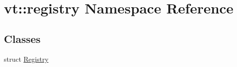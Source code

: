 \hypertarget{namespacevt_1_1registry}{}\section{vt\+:\+:registry Namespace Reference}
\label{namespacevt_1_1registry}
\subsection*{Classes}
\begin{DoxyCompactItemize}
\item 
struct \hyperlink{structvt_1_1registry_1_1_registry}{Registry}
\end{DoxyCompactItemize}
